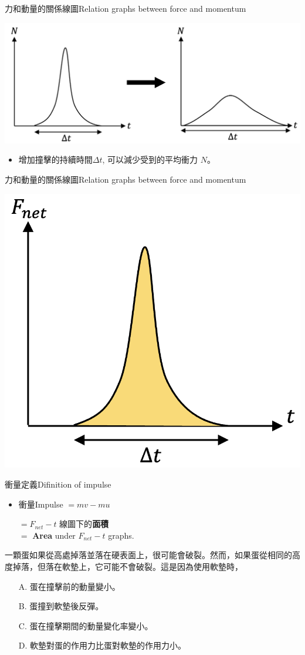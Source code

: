 \documentclass[beamer=true]{standalone}
\begin{document}
\begin{frame}{力和動量的關係線圖Relation graphs between force and momentum}
    \par{\par\centering
        \includegraphics[width=.8\textwidth]{assets/76cc933c.png}
        \par}\bigskip
    \begin{itemize}
        \item 增加撞擊的持續時間$\Delta t$, 可以減少受到的平均衝力 $N$。
    \end{itemize}
\end{frame}

\begin{frame}{力和動量的關係線圖Relation graphs between force and momentum}
    \par{\par\centering
        \includegraphics[width=.3\textwidth]{assets/99524ca7.png}
        \par}
    \begin{alertblock}
        {衝量定義Difinition of impulse}
        \begin{itemize}
            \item 衝量Impulse $=mv-mu$
            \item []$=F_{net}-t$ 線圖下的\textbf{面積}\\$=$ \textbf{Area} under $F_{net}-t$ graphs.
        \end{itemize}
    \end{alertblock}

\end{frame}

\begin{frame}{}
    一顆蛋如果從高處掉落並落在硬表面上，很可能會破裂。然而，如果蛋從相同的高度掉落，但落在軟墊上，它可能不會破裂。這是因為使用軟墊時，
    \begin{itemize}
        \item[A.] 蛋在撞擊前的動量變小。
        \item[B.] 蛋撞到軟墊後反彈。
        \item[C.] 蛋在撞擊期間的動量變化率變小。
        \item[D.] 軟墊對蛋的作用力比蛋對軟墊的作用力小。
    \end{itemize}
\end{frame}
\end{document}
